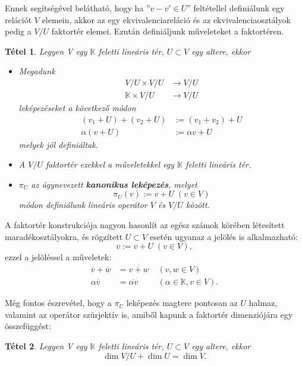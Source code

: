 \documentclass[oneside, titlepage, 12pt, a4paper]{report}
\newtheorem{theorem}{Tétel}[section]
\begin{document}
Ennek segítségével belátható, hogy ha  ''$v - v' \in U$'' feltétellel definiálunk egy relációt $V$ elemein, akkor az egy ekvivalenciareláció és az ekvivalenciaosztályok pedig a $V / U$ faktortér elemei. Ezután definiáljunk műveleteket a faktortéren.
\begin{theorem}
Legyen V egy $\mathbb{K}$ feletti lineáris tér, $U \subset V$ egy altere, ekkor
\begin{itemize}
\item
Megadunk	%
\begin{align*}
V / U \times V / U & \longrightarrow V / U \\
\mathbb{K} \times V / U & \longrightarrow V / U
\end{align*}
leképezéseket a következő módon
\begin{align}
(v_1 + U) + (v_2 + U) &:= (v_1 + v_2) + U \\
\alpha (v + U) &:= \alpha v + U
\end{align}
melyek jól definiáltak.
\item
A $V / U$ faktortér ezekkel a műveletekkel egy $\mathbb{K}$ feletti lineáris tér.
\item
$\pi_U$ az úgynevezett \textbf{kanonikus leképezés}, melyet	%
\begin{equation*}
\pi_U(v) := v + U \; (v \in V)
\end{equation*}
módon definiálunk lineáris operátor $V$ és $V / U$ között.
\end{itemize}
\end{theorem}

A faktortér konstrukciója nagyon hasonlít az egész számok körében létesített maradékosztályokra, és rögzített $U \subset V$ esetén ugyanaz a jelölés is alkalmazható:
\begin{equation*}
\overline{v} := v + U \; (v \in V),
\end{equation*}
ezzel a jelöléssel a műveletek:
\begin{align*}
\overline{v} + \overline{w} &= \overline{v + w} \; &(v, w \in V) \\
\alpha \overline{v} &= \overline{\alpha v} \; &(\alpha \in \mathbb{K}, v \in V).
\end{align*}

Még fontos észrevétel, hogy a $\pi_U$ leképezés magtere pontosan az $U$ halmaz, valamint az operátor szürjektív is, amiből kapunk a faktortér dimenziójára egy összefüggést:
\begin{theorem}
Legyen V egy $\mathbb{K}$ feletti lineáris tér, $U \subset V$ egy altere, ekkor
\begin{equation}
\dim V / U + \dim U = \dim V.
\end{equation}
\end{theorem}
\end{document}
